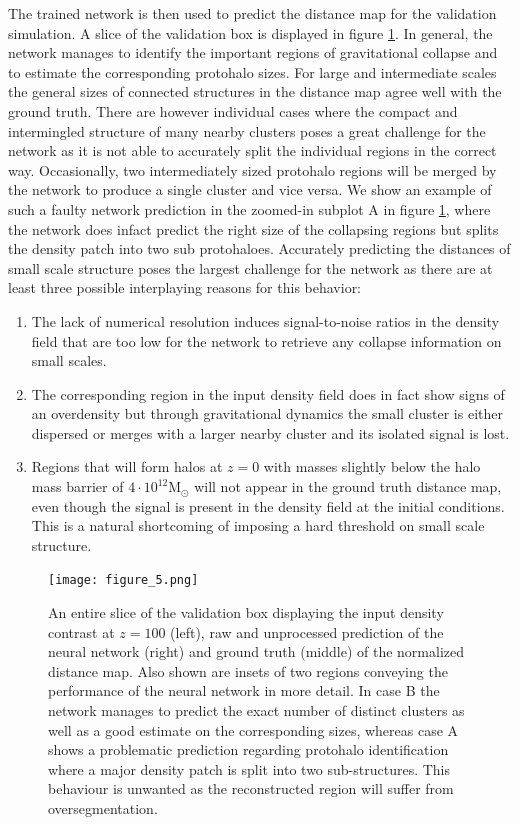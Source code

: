 \documentclass[fleqn,usenatbib]{mnras}
\newcommand{\Msun}{\text{M}_{\odot}}	%
\begin{document}
The trained network is then used to predict the distance map for the validation simulation. A slice of the validation box is displayed in figure \ref{fig:triple_combined}. In general, the network manages to identify the important regions of gravitational collapse and to estimate the corresponding protohalo sizes. For large and intermediate scales the general sizes of connected structures in the distance map agree well with the ground truth. There are however individual cases where the compact and intermingled structure of many nearby clusters poses a great challenge for the network as it is not able to accurately split the individual regions in the correct way. Occasionally, two intermediately sized protohalo regions will be merged by the network to produce a single cluster and vice versa. We show an example of such a faulty network prediction in the zoomed-in subplot A in figure \ref{fig:triple_combined}, where the network does infact predict the right size of the collapsing regions but splits the density patch into two sub protohaloes. Accurately predicting the distances of small scale structure poses the largest challenge for the network as there are at least three possible interplaying reasons for this behavior:
\begin{enumerate}
    \item The lack of numerical resolution induces signal-to-noise ratios in the density field that are too low for the network to retrieve any collapse information on small scales.
    \item The corresponding region in the input density field does in fact show signs of an overdensity but through gravitational dynamics the small cluster is either dispersed or merges with a larger nearby cluster and its isolated signal is lost.
    \item Regions that will form halos at $z=0$ with masses slightly below the halo mass barrier of $4\cdot10^{12}\Msun$ will not appear in the ground truth distance map, even though the signal is present in the density field at the initial conditions. This is a natural shortcoming of imposing a hard threshold on small scale structure.
\end{enumerate}

\begin{figure}
 \texttt{[image: figure\_5.png]}
 \caption{An entire slice of the validation box displaying the input density contrast at $z=100$ (left), raw and unprocessed prediction of the neural network (right) and ground truth (middle) of the normalized distance map. 
 Also shown are insets of two regions conveying the performance of the neural network in more detail.
 In case B the network manages to predict the exact number of distinct clusters as well as a good estimate on the corresponding sizes, whereas case A shows a problematic prediction regarding protohalo identification where a major density patch is split into two sub-structures. This behaviour is unwanted as the reconstructed region will suffer from oversegmentation.
 }
 \label{fig:triple_combined}
\end{figure}
\end{document}
